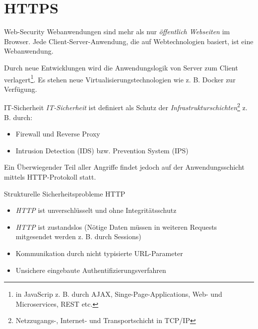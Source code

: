 \section{HTTPS}

\begin{defi}{Web-Security}
    Webanwendungen sind mehr als nur \emph{öffentlich Webseiten} im Browser.
    Jede Client-Server-Anwendung, die auf Webtechnologien basiert, ist eine Webanwendung.

    Durch neue Entwicklungen wird die Anwendungslogik von Server zum Client verlagert\footnote{in JavaScrip z. B. durch AJAX, Singe-Page-Applications, Web- und Microservices, REST etc.}.
    Es stehen neue Virtualisierungstechnologien wie z. B. Docker zur Verfügung.
\end{defi}

\begin{defi}{IT-Sicherheit}
    \emph{IT-Sicherheit} ist definiert als Schutz der \emph{Infrastrukturschichten}\footnote{Netzzugangs-, Internet- und Transportschicht in TCP/IP} z. B. durch:
    \begin{itemize}
        \item Firewall und Reverse Proxy
        \item Intrusion Detection (IDS) bzw. Prevention System (IPS)
    \end{itemize}

    Ein Überwiegender Teil aller Angriffe findet jedoch auf der Anwendungsschicht mittels HTTP-Protokoll statt.
\end{defi}

\begin{defi}{Strukturelle Sicherheitsprobleme HTTP}
    \begin{itemize}
        \item \emph{HTTP} ist unverschlüsselt und ohne Integritätsschutz
        \item \emph{HTTP} ist zustandslos (Nötige Daten müssen in weiteren Requests mitgesendet werden z. B. durch Sessions)
        \item Kommunikation durch nicht typisierte URL-Parameter
        \item Unsichere eingebaute Authentifizierungsverfahren
    \end{itemize}
\end{defi}

